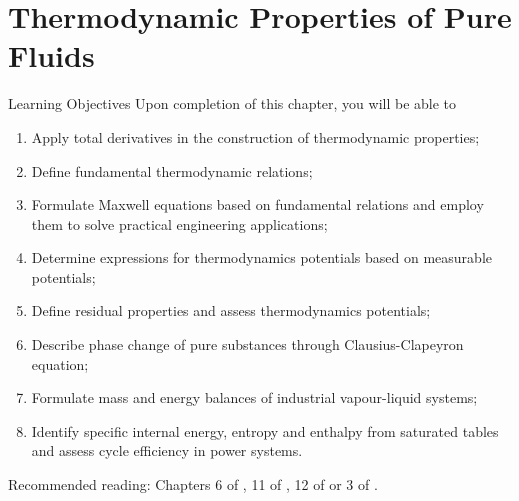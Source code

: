 \chapter{Thermodynamic Properties of Pure Fluids}\label{Chapter:ThermodynamicPropertiesPureFluids}

   \begin{LearningObjectivesBlock}{Learning Objectives}
      Upon completion of this chapter, you will be able to
        \begin{enumerate}
           \item Apply total derivatives in the construction of thermodynamic properties;
           \item Define fundamental thermodynamic relations;
           \item Formulate Maxwell equations based on fundamental relations and employ them to solve practical engineering applications;
           \item Determine expressions for thermodynamics potentials based on measurable potentials;
           \item Define residual properties and assess thermodynamics potentials;
           \item Describe phase change of pure substances through Clausius-Clapeyron equation;
           \item Formulate mass and energy balances of industrial vapour-liquid systems;
           \item Identify specific internal energy, entropy and enthalpy from saturated tables and assess cycle efficiency in power systems.
        \end{enumerate}
\medskip
     Recommended reading: Chapters 6 of \citet{SmithVanNess_Book}, 11 of \citet{Balmer_Book}, 12 of \citet{Borgnakke_Book} or 3 of \citet{Atkins_Book}.
   \end{LearningObjectivesBlock}

